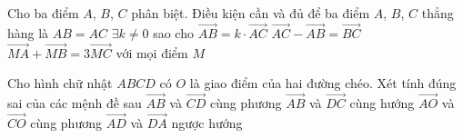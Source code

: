 

\begin{ex}%
	Cho ba điểm $A$, $B$, $C$ phân biệt. Điều kiện cần và đủ để ba điểm $A$, $B$, $C$ thẳng  hàng là
	\choice 
		{$AB=AC$} 
		{\True $\exists k\ne 0$ sao  cho $\overrightarrow{AB}=k\cdot \overrightarrow{AC}$}
		{$\overrightarrow{AC}-\overrightarrow{AB}=\overrightarrow{BC}$} 
		{$\overrightarrow{MA}+\overrightarrow{MB}=3\overrightarrow{MC}$ với mọi  điểm $M$}
\end{ex}



\begin{ex}%
	Cho hình chữ nhật  $ABCD$ có $O$ là giao điểm của hai đường chéo. Xét tính đúng sai của các mệnh đề sau
	 \choiceTF
		{\True $\overrightarrow{AB}$  và $\overrightarrow{CD}$ cùng phương}
		{\True  $\overrightarrow{AB}$ và $\overrightarrow{DC}$ cùng hướng}
		{\True $\overrightarrow{AO}$  và $\overrightarrow{CO}$ cùng phương}
		{\True  $\overrightarrow{AD}$ và $\overrightarrow{DA}$ ngược hướng}
\end{ex}

